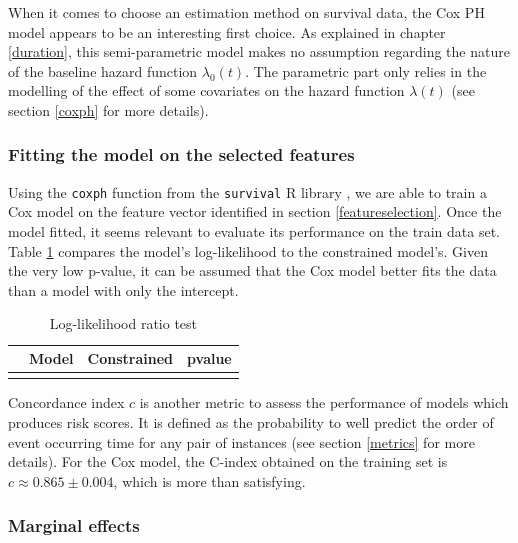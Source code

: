 \documentclass[
]{book}
\begin{document}
When it comes to choose an estimation method on survival data, the Cox PH model appears to be an interesting first choice. As explained in chapter \ref{duration}, this semi-parametric model makes no assumption regarding the nature of the baseline hazard function \(\lambda_0(t)\). The parametric part only relies in the modelling of the effect of some covariates on the hazard function \(\lambda(t)\) (see section \ref{coxph} for more details).

\hypertarget{fitting-the-model-on-the-selected-features}{%
\subsubsection*{Fitting the model on the selected features}\label{fitting-the-model-on-the-selected-features}}

Using the \texttt{coxph} function from the \texttt{survival} R library \citep{survival-book}, we are able to train a Cox model on the feature vector identified in section \ref{featureselection}. Once the model fitted, it seems relevant to evaluate its performance on the train data set. Table \ref{tab:lrtest} compares the model's log-likelihood to the constrained model's. Given the very low p-value, it can be assumed that the Cox model better fits the data than a model with only the intercept.

\begin{table}[H]

\caption{\label{tab:lrtest}Log-likelihood ratio test}
\centering
\begin{tabular}[t]{lrrr}
\toprule
  & Model & Constrained & pvalue\\
\midrule
\cellcolor{gray!6}{} & \cellcolor{gray!6}{-9228.77} & \cellcolor{gray!6}{-10448.08} & \cellcolor{gray!6}{0}\\
\bottomrule
\end{tabular}
\end{table}

Concordance index \(c\) is another metric to assess the performance of models which produces risk scores. It is defined as the probability to well predict the order of event occurring time for any pair of instances (see section \ref{metrics} for more details). For the Cox model, the C-index obtained on the training set is \(c \approx 0.865 \pm 0.004\), which is more than satisfying.

\hypertarget{marginal-effects-1}{%
\subsubsection*{Marginal effects}\label{marginal-effects-1}}
\end{document}
